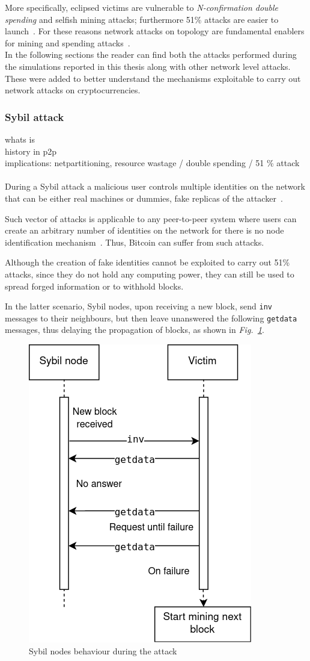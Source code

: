 \documentclass[12pt, letterpaper, twoside]{article}
\begin{document}
More specifically, eclipsed victims are vulnerable to \textit{N-confirmation double spending} and selfish mining attacks; furthermore 51\% attacks are easier to launch~\cite{eclipseatk}. For these reasons network attacks on topology are fundamental enablers for mining and spending attacks~\cite{dotan2020surveychallenges}.\\

In the following sections the reader can find both the attacks performed during the simulations reported in this thesis along with other network level attacks. These were added to better understand the mechanisms exploitable to carry out network attacks on cryptocurrencies.


\subsubsection{Sybil attack}\label{sec:sec:sybil}
whats is\\
history in p2p\\
implications: netpartitioning, resource wastage / double spending / 51 \% attack\\
\\
During a Sybil attack a malicious user controls multiple identities on the network that can be either real machines or dummies, fake replicas of the attacker~\cite{douceur2002sybil}.

Such vector of attacks is applicable to any peer-to-peer system where users can create an arbitrary number of identities on the network for there is no node identification mechanism~\cite{kedziora-sybil-ledgers}. Thus, Bitcoin can suffer from such attacks.

Although the creation of fake identities cannot be exploited to carry out 51\% attacks, since they do not hold any computing power, they can still be used to spread forged information or to withhold blocks.

In the latter scenario, Sybil nodes, upon receiving a new block, send \texttt{inv} messages to their neighbours, but then leave unanswered the following \texttt{getdata} messages, thus delaying the propagation of blocks, as shown in \emph{Fig.~\ref{fig:sybil}}.

\begin{figure}[h!]
	\includegraphics[width=.4\textwidth]{pict/sybil.png}
	\centering
	\caption{Sybil nodes behaviour during the attack}
	\label{fig:sybil}
\end{figure}
\end{document}
